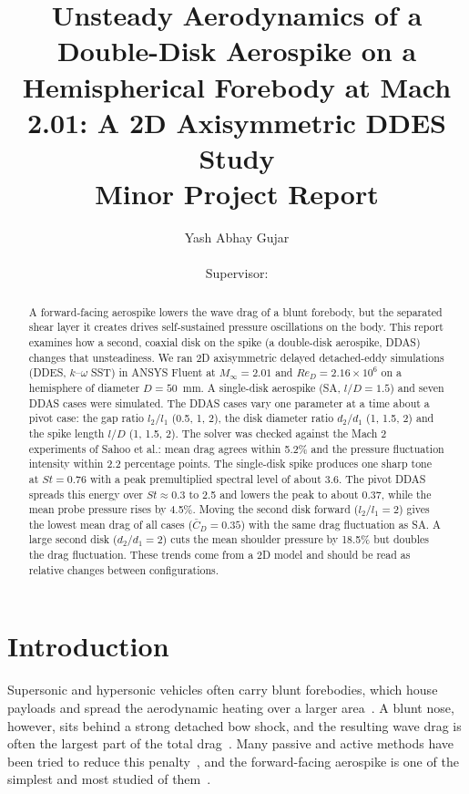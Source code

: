\documentclass[11pt,a4paper]{article}
\title{\textbf{Unsteady Aerodynamics of a Double-Disk Aerospike on a Hemispherical Forebody at Mach 2.01: A 2D Axisymmetric DDES Study}\\[6pt]
\large Minor Project Report}
\author{Yash Abhay Gujar\\ \chk{Programme, Department, Institute}\\[4pt] Supervisor: \chk{Name}}
\date{\chk{Month 2026}}
\newcommand{\Cdm}{\bar{C}_D}
\newcommand{\ltl}{l_2/l_1}
\newcommand{\dtd}{d_2/d_1}
\begin{document}
\maketitle

\begin{abstract}
A forward-facing aerospike lowers the wave drag of a blunt forebody, but the separated shear layer it creates drives self-sustained pressure oscillations on the body. This report examines how a second, coaxial disk on the spike (a double-disk aerospike, DDAS) changes that unsteadiness. We ran 2D axisymmetric delayed detached-eddy simulations (DDES, $k$--$\omega$ SST) in ANSYS Fluent at $M_\infty = 2.01$ and $Re_D = 2.16\times10^6$ on a hemisphere of diameter $D = 50$~mm. A single-disk aerospike (SA, $l/D = 1.5$) and seven DDAS cases were simulated. The DDAS cases vary one parameter at a time about a pivot case: the gap ratio $\ltl$ (0.5, 1, 2), the disk diameter ratio $\dtd$ (1, 1.5, 2) and the spike length $l/D$ (1, 1.5, 2). The solver was checked against the Mach 2 experiments of Sahoo et al.: mean drag agrees within 5.2\% and the pressure fluctuation intensity within 2.2 percentage points. The single-disk spike produces one sharp tone at $St = 0.76$ with a peak premultiplied spectral level of about 3.6. The pivot DDAS spreads this energy over $St \approx 0.3$ to 2.5 and lowers the peak to about 0.37, while the mean probe pressure rises by 4.5\%. Moving the second disk forward ($\ltl = 2$) gives the lowest mean drag of all cases ($\Cdm = 0.35$) with the same drag fluctuation as SA. A large second disk ($\dtd = 2$) cuts the mean shoulder pressure by 18.5\% but doubles the drag fluctuation. These trends come from a 2D model and should be read as relative changes between configurations.
\end{abstract}

\tableofcontents
\newpage

\section{Introduction}

Supersonic and hypersonic vehicles often carry blunt forebodies, which house payloads and spread the aerodynamic heating over a larger area~\cite{Ahmed2011recent}. A blunt nose, however, sits behind a strong detached bow shock, and the resulting wave drag is often the largest part of the total drag~\cite{Bushnell2004shock}. Many passive and active methods have been tried to reduce this penalty~\cite{Wang2016experimental,Karimi2019investigation,Rashid2022review}, and the forward-facing aerospike is one of the simplest and most studied of them~\cite{Sarwar2025recent}.
\end{document}
